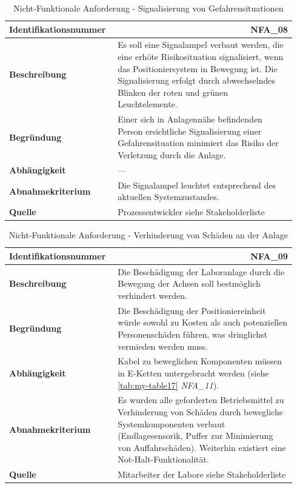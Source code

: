 \documentclass[../../../Bachelorarbeit.tex]{subfiles}
\begin{document}
\begin{table}[H]
    \centering
    \begin{tabular}{ p{0.34\linewidth}  p{0.6\linewidth} }
        \hline
        \textbf{Identifikationsnummer}  & \multicolumn{1}{r}{NFA\_08} \\ \hline
        \textbf{Beschreibung}           & Es soll eine Signalampel verbaut werden, die eine erhöte Risikosituation signalisiert, wenn das Positioniersystem in Bewegung ist. Die Signalisierung erfolgt durch abwechselndes Blinken der roten und grünen Leuchtelemente. \\
        \textbf{Begründung}             & Einer sich in Anlagennähe befindenden Person ersichtliche Signalisierung einer Gefahrensituation minimiert das Risiko der Verletzung durch die Anlage. \\
        \textbf{Abhängigkeit}           & --- \\
        \textbf{Abnahmekriterium}       & Die Signalampel leuchtet entsprechend des aktuellen Systemzustandes. \\
        \textbf{Quelle}                 & Prozessentwickler siehe Stakeholderliste \\ \hline
    \end{tabular}
    \caption[\acs{nfa} - Signalisierung Gefahrensituation]{Nicht-Funktionale Anforderung - Signalisierung von Gefahrensituationen}
    \label{tab:my-table14}
\end{table}
\begin{table}[H]
    \centering
    \begin{tabular}{ p{0.34\linewidth}  p{0.6\linewidth} }
        \hline
        \textbf{Identifikationsnummer}  & \multicolumn{1}{r}{NFA\_09} \\ \hline
        \textbf{Beschreibung}           & Die Beschädigung der Laboranlage durch die Bewegung der Achsen soll bestmöglich verhindert werden. \\
        \textbf{Begründung}             & Die Beschädigung der Positioniereinheit würde sowohl zu Kosten als auch potenziellen Personenschäden führen, was dringlichst vermieden werden muss. \\
        \textbf{Abhängigkeit}           & Kabel zu beweglichen Komponenten müssen in E-Ketten untergebracht werden (siehe \autoref{tab:my-table17} \textit{NFA\_11}). \\
        \textbf{Abnahmekriterium}       & Es wurden alle geforderten Betriebsmittel zu Verhinderung von Schäden durch bewegliche Systemkomponenten verbaut (Endlagesensorik, Puffer zur Minimierung von Auffahrschäden). Weiterhin existiert eine Not-Halt-Funktionalität. \\
        \textbf{Quelle}                 & Mitarbeiter der Labore siehe Stakeholderliste \\ \hline
    \end{tabular}
    \caption[\acs{nfa} - Verhinderung von Schäden an der Anlage]{Nicht-Funktionale Anforderung - Verhinderung von Schäden an der Anlage}
    \label{tab:my-table15}
\end{table}
\end{document}
